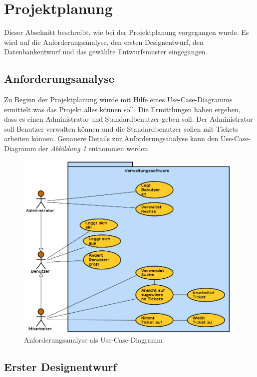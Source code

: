 \documentclass[12pt, a4paper]{article}
\begin{document}
\section{Projektplanung}
Dieser Abschnitt beschreibt, wie bei der Projektplanung vorgegangen wurde. Es wird auf die  Anforderungsanalyse, den ersten Designentwurf, den Datenbankentwurf und das gewählte Entwurfsmuster eingegangen.

\subsection{Anforderungsanalyse}
Zu Beginn der Projektplanung wurde mit Hilfe eines Use-Case-Diagramms ermittelt was das Projekt alles können soll. Die Ermittlungen haben ergeben, dass es einen Administrator und Standardbenutzer geben soll. Der Administrator soll Benutzer verwalten können und die Standardbenutzer sollen mit Tickets arbeiten können. Genauere Details zur Anforderungsanalyse kann den Use-Case-Diagramm der \textit{Abbildung 1} entnommen werden.

\begin{figure}[H]
	\begin{center}
	\includegraphics[width=110mm]{Bilder/UseCaseAnforderungsanalyse.png}
	\end{center}
	\caption{Anforderungsanalyse als Use-Case-Diagramm}
\end{figure}

\subsection{Erster Designentwurf}
\end{document}
